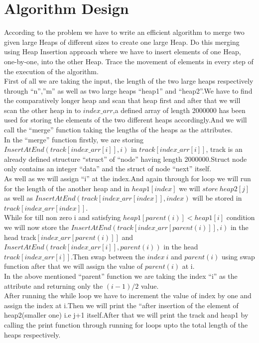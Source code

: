 \documentclass[conference]{IEEEtran}
\begin{document}
\section{\textbf{Algorithm Design}}
According to the problem we have to write an efficient algorithm to merge two given large Heaps of different sizes to create one large Heap. Do this merging using Heap Insertion approach where we have to insert elements of one Heap, one-by-one, into the other Heap. Trace the movement of elements in every step of the execution of the algorithm.\\

First of all we are taking the input, the length of the two large heaps respectively through “n”,”m” as well as two large heaps “heap1” and “heap2”.We have to find the comparatively longer heap and scan that heap first and after that we will scan the other heap in to $index\_arr$,a defined array of length 2000000 has been used for storing the elements of the two different heaps accordingly.And we will call the “merge” function taking the lengths of the heaps as the attributes.\\

In the “merge” function firstly, we are storing $InsertAtEnd(track[index\_arr[i]], i)$ in $track[index\_arr[i]]$, track is an already defined structure “struct” of “node” having length 2000000.Struct node only contains an integer “data” and the struct of node “next” itself.\\
As well as we will assign “i” at the index.And again through for loop we will run for the length of the another heap and in $heap1[index]$ we will $store\ heap2[j]$ as well as $InsertAtEnd(track[index\_arr[index]], index)$ will be stored in $track[index\_arr[index]]$.\\

While for till non zero i and satisfying $heap1[parent(i)]<heap1[i]$ condition we will now store the $InsertAtEnd(track[index\_arr[parent(i)]], i)$ in the head  track$[index\_arr[parent(i)]]$ and $InsertAtEnd(track[index\_arr[i]], parent(i))$ in the head  $track[index\_arr[i]]$.Then swap between the $index\ i$ and	$parent(i)$ using swap function after that we will  assign the value of $parent(i)$ at i.\\

In the above mentioned “parent” function we are taking the index “i” as the attribute and returning only the $(i-1)/2$ value.\\

After running the while loop we have to increment the value of index by one and assign the index at i.Then we will print the “after insertion of the element of heap2(smaller one) i.e j+1 itself.After that we will print the track and heap1 by calling the print function through running for loops upto the total length of the heaps respectively.\\
\end{document}
